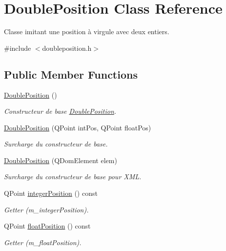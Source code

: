 \hypertarget{class_double_position}{}\section{Double\+Position Class Reference}
\label{class_double_position}


Classe imitant une position à virgule avec deux entiers.  




{\ttfamily \#include $<$doubleposition.\+h$>$}

\subsection*{Public Member Functions}
\begin{DoxyCompactItemize}
\item 
\hyperlink{class_double_position_a801bc7f47d6c1ada127b308e14538a3d}{Double\+Position} ()
\begin{DoxyCompactList}\small\item\em Constructeur de base \hyperlink{class_double_position}{Double\+Position}. \end{DoxyCompactList}\item 
\hyperlink{class_double_position_a496aec1866319f503156051b938eafbb}{Double\+Position} (Q\+Point int\+Pos, Q\+Point float\+Pos)
\begin{DoxyCompactList}\small\item\em Surcharge du constructeur de base. \end{DoxyCompactList}\item 
\hyperlink{class_double_position_a9eb14f4d74c0bc4dc9a30bcc765f93a4}{Double\+Position} (Q\+Dom\+Element elem)
\begin{DoxyCompactList}\small\item\em Surcharge du constructeur de base pour X\+M\+L. \end{DoxyCompactList}\item 
Q\+Point \hyperlink{class_double_position_afc3276b37b2cca9d982f4773b35a450a}{integer\+Position} () const 
\begin{DoxyCompactList}\small\item\em Getter (m\+\_\+integer\+Position). \end{DoxyCompactList}\item 
Q\+Point \hyperlink{class_double_position_aa5b3aff5c9c95efefb3f9625ec514fa0}{float\+Position} () const 
\begin{DoxyCompactList}\small\item\em Getter (m\+\_\+float\+Position). \end{DoxyCompactList}\item 

\end{DoxyCompactItemize}
